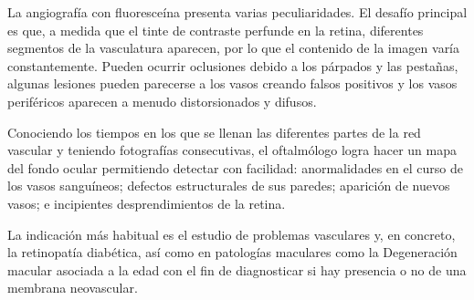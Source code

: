 La angiograf\'ia con fluoresce\'ina presenta varias peculiaridades. El desaf\'io principal es que, a medida que el tinte de contraste  perfunde en la retina, diferentes segmentos de la vasculatura aparecen, por lo que el contenido de la imagen var\'ia constantemente.
Pueden ocurrir oclusiones debido a los p\'arpados y las pestañas, algunas lesiones pueden parecerse a los vasos creando falsos positivos y los vasos perif\'ericos aparecen a menudo distorsionados y difusos. \cite{perez2011improving}

Conociendo los tiempos en los que se llenan las diferentes partes de la red vascular y teniendo fotograf\'ias consecutivas, el oftalm\'ologo logra hacer un mapa del fondo ocular permitiendo detectar con facilidad: anormalidades en el curso de los vasos sangu\'ineos; defectos estructurales de sus paredes; aparición de nuevos vasos; e incipientes desprendimientos de la retina. 

La indicaci\'on más habitual es el estudio de problemas vasculares y, en concreto, la retinopat\'ia diab\'etica, as\'i como en patolog\'ias maculares como la Degeneraci\'on macular asociada a la edad con el fin de diagnosticar si hay presencia o no de una membrana neovascular.
\\

